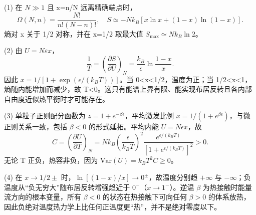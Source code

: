 (1) 在 \(N\gg 1\) 且 x=n/N 远离精确端点时，
\[
\Omega(N,n)=\frac{N!}{n!(N-n)!},\quad
S\simeq-Nk_B[x\ln x+(1-x)\ln(1-x)].
\]
熵对 x 关于 1/2 对称，并在 x=1/2 取最大值 \(S_{\max}\simeq Nk_B\ln2\)。

(2) 由 \(U=N\varepsilon x\)，
\[
\frac1T=\left(\frac{\partial S}{\partial U}\right)_N
=\frac{k_B}{\epsilon}\ln\frac{1-x}{x}.
\]
因此 \(x=1/[1+\exp(\epsilon/(k_BT))]\)。当 0<x<1/2，温度为正；当 1/2<x<1，熵随内能增加而减少，故 T<0。这只有能谱上界有限、能实现布居反转且各内部自由度近似热平衡时才可能存在。

(3) 单粒子正则配分函数为 \(z=1+e^{-\beta\epsilon}\)，平均激发比例 \(x=1/(1+e^{\beta\epsilon})\)，与微正则关系一致，包括 \(\beta <0\) 的形式延拓。平均内能 \(U=N\epsilon x\)，故
\[
C=\left(\frac{\partial U}{\partial T}\right)_N
=Nk_B\left(\frac{\epsilon}{k_BT}\right)^2
\frac{e^{\epsilon/(k_BT)}}{[1+e^{\epsilon/(k_BT)}]^2}>0.
\]
无论 T 正负，热容非负，因为 \(\mathrm{Var}(U)=k_BT^2C\ge0\)。

(4) 在 \(x\to 1/2\pm \) 时，\(\ln[(1-x)/x]\to0^\pm\)，故温度分别趋 \(+\infty \) 与 \(-\infty \)；负温度从“负无穷大”随布居反转增强趋近于 \(0^-\)（\(x\to 1^{-}\)）。逆温 \(\beta \) 为热接触时能量流方向的根本变量，所有 \(\beta <0\) 的状态在热接触下可向任何 \(\beta >0\) 的体系放热，因此负绝对温度热力学上比任何正温度更“热”，并不是绝对零度以下。
